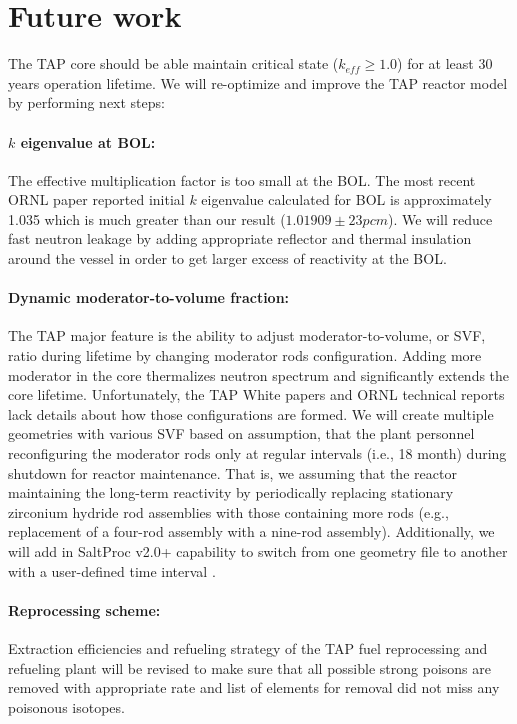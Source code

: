 \documentclass[12pt]{article} %
\begin{document}
\section{Future work}
The \gls{TAP} core should be able maintain critical state ($k_{eff}\geq 1.0$) 
for at least 30 years operation lifetime. We will re-optimize and improve the 
\gls{TAP} reactor model by performing next steps:
\paragraph{$k$ eigenvalue at \gls{BOL}:} The effective multiplication factor is 
too small at the \gls{BOL}. The most recent 
\gls{ORNL} paper \cite{betzler_fuel_2018} reported initial $k$ eigenvalue calculated 
for \gls{BOL} is approximately 1.035 which is much greater than our result 
($1.01909\pm23pcm$). We will reduce fast neutron leakage by adding appropriate 
reflector and thermal insulation around the vessel in order to get larger excess of 
reactivity at the \gls{BOL}.
\paragraph{Dynamic moderator-to-volume fraction:} The \gls{TAP} major feature is 
the ability to adjust moderator-to-volume, or \gls{SVF}, ratio during lifetime 
by changing moderator rods configuration. Adding more moderator in the core 
thermalizes neutron spectrum and significantly extends the core lifetime. 
Unfortunately, the \gls{TAP} White 
papers and \gls{ORNL} technical reports lack details about how those configurations 
are formed. 
We will create multiple geometries with various \gls{SVF} based on assumption, 
that the plant personnel reconfiguring the
moderator rods only at regular intervals (i.e., 18 month) during shutdown for 
reactor maintenance. That is, we assuming that the reactor maintaining
the long-term reactivity by periodically replacing stationary
zirconium hydride rod assemblies with those containing more rods
(e.g., replacement of a four-rod assembly with a nine-rod assembly). 
Additionally, we will add in SaltProc v2.0+ capability to switch from one 
geometry file to another with a user-defined time interval \cite{betzler_fuel_2018}. 
\paragraph{Reprocessing scheme:} Extraction efficiencies and refueling strategy 
of the \gls{TAP} fuel reprocessing and refueling plant will be revised to make 
sure that all possible strong poisons are removed with appropriate rate and 
list of elements for removal did not miss any poisonous isotopes.






%

\end{document}
